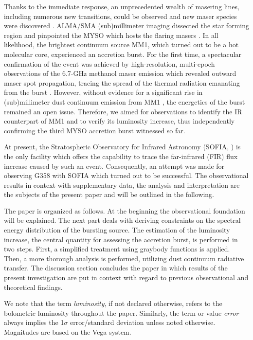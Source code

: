 Thanks to the immediate response, an unprecedented wealth of masering lines, including numerous new transitions, could be observed \citep{2019ApJ...876L..25B, 2019ApJ...881L..39B, 2019MNRAS.489.3981M} and new maser species were discovered \citep{2020ApJ...890L..22C, 2020NatAs.tmp..144C}. ALMA/SMA (sub)millimeter imaging dissected the star forming region and pinpointed the MYSO which hosts the flaring masers \citep{2019ApJ...881L..39B}. In all likelihood, the brightest continuum source MM1, which turned out to be a hot molecular core, experienced an accretion burst. For the first time, a spectacular confirmation of the event was achieved by high-resolution, multi-epoch observations of the 6.7-GHz methanol maser emission which revealed outward maser spot propagation, tracing the spread of the thermal radiation emanating from the burst \citep{2020NatAs...4..506B}.
However, without evidence for a significant rise in (sub)millimeter dust continuum emission from
MM1 \citep{2019ApJ...881L..39B}, the energetics of the burst remained an open issue. Therefore, we aimed for observations to identify the IR counterpart of MM1 and to verify its luminosity increase, thus independently confirming the third MYSO accretion burst witnessed so far. 

At present, the Stratospheric Observatory for Infrared Astronomy (SOFIA, \citealp{1993AdSpR..13..549E, 2012ApJ...749L..17Y}) is the only facility which offers the capability to trace the far-infrared (FIR) flux increase caused by such an event. Consequently, an attempt was made for observing G358 with SOFIA which turned out to be successful. The observational results in context with supplementary data, the analysis and interpretation are the subjects of the present paper and will be outlined in the following.

The paper is organized as follows. At the beginning the observational foundation will be explained. The next part deals with deriving constraints on the spectral energy distribution of the bursting source. The estimation of the luminosity increase, the central quantity for assessing the accretion burst, is performed in two steps. First, a simplified treatment using graybody functions is applied. Then, a more thorough analysis is performed, utilizing dust continuum radiative transfer. The discussion section concludes the paper in which results of the present investigation are put in context with regard to previous observational and theoretical findings.

We note that the term {\em luminosity}, if not declared otherwise, refers to the bolometric luminosity throughout the paper. Similarly, the term or value {\em error} always implies the 1$\sigma$ error/standard deviation unless noted otherwise. Magnitudes are based on the Vega system.


